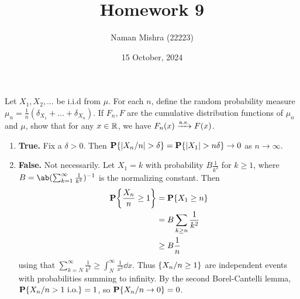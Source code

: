 \documentclass[12pt]{article}
\title{Homework 9}
\author{Naman Mishra (22223)}
\date{15 October, 2024}
\begin{document}
\maketitle

\begin{problem*}
    Let $X_1, X_2, \dots$ be i.i.d from $\mu$.
    For each $n$, define the random probability measure
    $\mu_n = \frac1n (\delta_{X_1} + \dots + \delta_{X_n})$.
    If $F_n, F$ are the cumulative distribution functions of $\mu_n$ and
    $\mu$, show that for any $x \in \mathbb{R}$, we have $F_n(x) \xrightarrow{\text{a.s.}} F(x)$.
\end{problem*}
\begin{solution} \leavevmode
    \begin{enumerate}
        \item \textbf{True.}
        Fix a $\delta > 0$.
        Then $\operatorname{\mathbf P}\{\lvert X_n/n\rvert > \delta\} = \operatorname{\mathbf P}\{\lvert X_1\rvert > n\delta\}
        \to 0$ as $n \to \infty$.
        \item \textbf{False.} Not necessarily.
        Let $X_1 = k$ with probability $B \frac1{k^2}$ for $k \ge 1$,
        where $B = \ab(\sum_{k=1}^\infty \frac1{k^2})^{-1}$ is the
        normalizing constant.
        Then \begin{align*}
            \P\set*{\frac{X_n}{n} \ge 1} &= \P\set{X_1 \ge n} \\
                &= B \sum_{k \ge n} \frac1{k^2} \\
                &\ge B \frac1n
        \end{align*} using that
        $\sum_{k=N}^\infty \frac1{k^2} \ge \int_N^\infty \frac1{x^2} \dd x$.
        Thus $\{X_n/n \ge 1\}$ are independent events with
        probabilities summing to infinity.
        By the second Borel-Cantelli lemma,
        $\operatorname{\mathbf P}\{X_n/n > 1 \text{ i.o.}\} = 1$, so
        $\operatorname{\mathbf P}\{X_n/n \to 0\} = 0$.
    \end{enumerate}
\end{solution}
\end{document}
